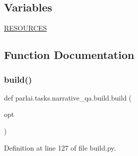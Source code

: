 \subsection*{Variables}
\begin{DoxyCompactItemize}
\item 
\hyperlink{namespaceparlai_1_1tasks_1_1narrative__qa_1_1build_aa2ea03188267ab219abf13b1203daacd}{R\+E\+S\+O\+U\+R\+C\+ES}
\end{DoxyCompactItemize}


\subsection{Function Documentation}
\mbox{\label{namespaceparlai_1_1tasks_1_1narrative__qa_1_1build_a51a4aace1ca9f9cbdc332405edaf1ef5}} 
\subsubsection{\texorpdfstring{build()}{build()}}
{\footnotesize\ttfamily def parlai.\+tasks.\+narrative\+\_\+qa.\+build.\+build (\begin{DoxyParamCaption}\item[{}]{opt }\end{DoxyParamCaption})}



Definition at line 127 of file build.\+py.


